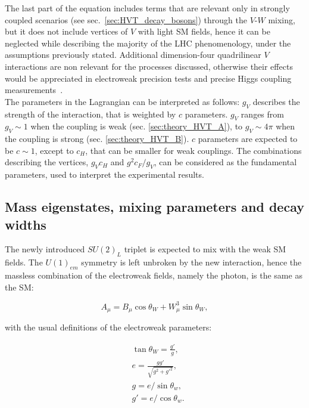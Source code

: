 \noindent The last part of the equation includes terms that are relevant only in strongly coupled scenarios (see sec.~\ref{sec:HVT_decay_bosons}) through the $V$-$W$ mixing, but it does not include vertices of $V$ with light SM fields, hence it can be neglected while describing the majority of the LHC phenomenology, under the assumptions previously stated. Additional dimension-four quadrilinear $V$ interactions are non relevant for the processes discussed, otherwise their effects would be appreciated in electroweak precision tests and precise Higgs coupling measurements~\cite{Giudice:2007fh}.\\

\noindent The parameters in the Lagrangian can be interpreted as follows: $g_V$ describes the strength of the interaction, that is weighted by $c$ parameters. $g_V$ ranges from $g_V \sim 1$ when the coupling is weak (sec. \ref{sec:theory_HVT_A}), to $g_V \sim 4 \pi$ when the coupling is strong (sec. \ref{sec:theory_HVT_B}). $c$ parameters are expected to be $c \sim 1$, except to $c_H$, that can be smaller for weak couplings. The combinations describing the vertices, $g_V c_H$ and $g^2 c_F/g_V$, can be considered as the fundamental parameters, used to interpret the experimental results.

\subsection{Mass eigenstates, mixing parameters and decay widths}
\label{sec:HVT_pheno}

The newly introduced $SU(2)_L$ triplet is expected to mix with the weak SM fields. The $U(1)_{em}$ symmetry is left unbroken by the new interaction, hence the massless combination of the electroweak fields, namely the photon, is the same as the SM:

\begin{equation}
A_{\mu} = B_{\mu} \cos{\theta_W} + W_{\mu}^3 \sin{\theta_W},
\label{eq:A_mu}
\end{equation} 

\noindent with the usual definitions of the electroweak parameters:

\begin{equation}
\begin{split}
 & \tan{\theta_W}=\frac{g'}{g}, \\
 & e = \frac{g g'}{\sqrt{g^2 + {g'}^2}}, \\
 & g = e/\sin{\theta_w},\\
 & g' = e/\cos{\theta_w}.\\
\end{split}
\label{eq:ewk_param}
\end{equation}

